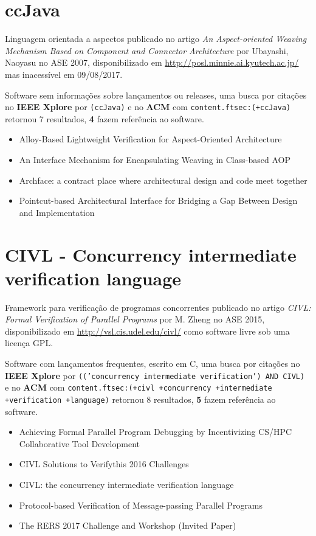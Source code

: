 \section{ccJava}

Linguagem orientada a aspectos
publicado no artigo {\it An Aspect-oriented Weaving Mechanism Based on Component and Connector Architecture}
por Ubayashi, Naoyasu
no ASE 2007,
disponibilizado em \url{http://posl.minnie.ai.kyutech.ac.jp/}
mas inacessível em 09/08/2017.

Software sem informações sobre lançamentos ou releases,
uma busca por citações no {\bf IEEE Xplore} por
\texttt{(ccJava)}
e no {\bf ACM} com
\texttt{content.ftsec:(+ccJava)}
retornou
7 resultados,
{\bf 4} fazem referência ao software.

\begin{itemize}
\item Alloy-Based Lightweight Verification for Aspect-Oriented Architecture
\item An Interface Mechanism for Encapsulating Weaving in Class-based AOP
\item Archface: a contract place where architectural design and code meet together
\item Pointcut-based Architectural Interface for Bridging a Gap Between Design and Implementation
\end{itemize}


\section{CIVL - Concurrency intermediate verification language}

Framework para verificação de programas concorrentes
publicado no artigo {\it CIVL: Formal Verification of Parallel Programs}
por M. Zheng
no ASE 2015,
disponibilizado em \url{http://vsl.cis.udel.edu/civl/}
como software livre
sob uma licença GPL.

Software com lançamentos frequentes,
escrito em C,
uma busca por citações no {\bf IEEE Xplore} por
\texttt{(('concurrency intermediate verification') AND CIVL)}
e no {\bf ACM} com
\texttt{content.ftsec:(+civl +concurrency +intermediate +verification +language)}
retornou
8 resultados,
{\bf 5} fazem referência ao software.

\begin{itemize}
\item Achieving Formal Parallel Program Debugging by Incentivizing CS/HPC Collaborative Tool Development
\item CIVL Solutions to Verifythis 2016 Challenges
\item CIVL: the concurrency intermediate verification language
\item Protocol-based Verification of Message-passing Parallel Programs
\item The RERS 2017 Challenge and Workshop (Invited Paper)
\end{itemize}


